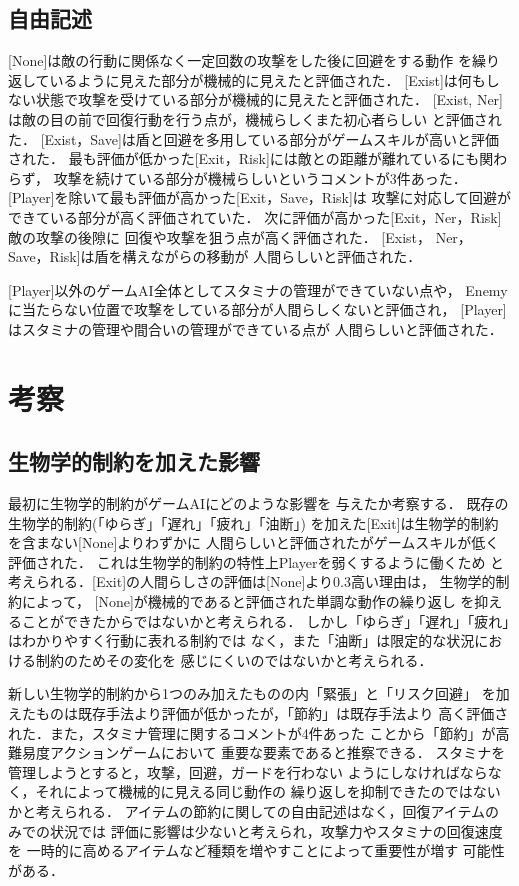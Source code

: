 \documentclass[a4paper,12pt,oneside,openany,titlepage]{jreport}
\begin{document}
 \section{自由記述}
 [None]は敵の行動に関係なく一定回数の攻撃をした後に回避をする動作
 を繰り返しているように見えた部分が機械的に見えたと評価された．
 [Exist]は何もしない状態で攻撃を受けている部分が機械的に見えたと評価された．
 [Exist, Ner]は敵の目の前で回復行動を行う点が，機械らしくまた初心者らしい
 と評価された．
 [Exist，Save]は盾と回避を多用している部分がゲームスキルが高いと評価された．
 最も評価が低かった[Exit，Risk]には敵との距離が離れているにも関わらず，
 攻撃を続けている部分が機械らしいというコメントが3件あった．
 [Player]を除いて最も評価が高かった[Exit，Save，Risk]は
 攻撃に対応して回避ができている部分が高く評価されていた．
 次に評価が高かった[Exit，Ner，Risk]敵の攻撃の後隙に
 回復や攻撃を狙う点が高く評価された．
 [Exist， Ner，Save，Risk]は盾を構えながらの移動が
 人間らしいと評価された．
 
 [Player]以外のゲームAI全体としてスタミナの管理ができていない点や，
 Enemyに当たらない位置で攻撃をしている部分が人間らしくないと評価され，
 [Player]はスタミナの管理や間合いの管理ができている点が
 人間らしいと評価された．


\chapter{考察}
\thispagestyle{fancy}
\lhead{\leftmark}
\rhead{\thepage}
\renewcommand{\headrulewidth}{1pt}

\section{生物学的制約を加えた影響}
最初に生物学的制約がゲームAIにどのような影響を
与えたか考察する．
既存の生物学的制約(「ゆらぎ」「遅れ」「疲れ」「油断」)
を加えた[Exit]は生物学的制約を含まない[None]よりわずかに
人間らしいと評価されたがゲームスキルが低く評価された．
これは生物学的制約の特性上Playerを弱くするように働くため
と考えられる．[Exit]の人間らしさの評価は[None]より0.3高い理由は，
生物学的制約によって，
[None]が機械的であると評価された単調な動作の繰り返し
を抑えることができたからではないかと考えられる．
しかし「ゆらぎ」「遅れ」「疲れ」はわかりやすく行動に表れる制約では
なく，また「油断」は限定的な状況における制約のためその変化を
感じにくいのではないかと考えられる．

新しい生物学的制約から1つのみ加えたものの内「緊張」と「リスク回避」
を加えたものは既存手法より評価が低かったが，「節約」は既存手法より
高く評価された．また，スタミナ管理に関するコメントが4件あった
ことから「節約」が高難易度アクションゲームにおいて
重要な要素であると推察できる．
スタミナを管理しようとすると，攻撃，回避，ガードを行わない
ようにしなければならなく，それによって機械的に見える同じ動作の
繰り返しを抑制できたのではないかと考えられる．
アイテムの節約に関しての自由記述はなく，回復アイテムのみでの状況では
評価に影響は少ないと考えられ，攻撃力やスタミナの回復速度を
一時的に高めるアイテムなど種類を増やすことによって重要性が増す
可能性がある．
\end{document}
